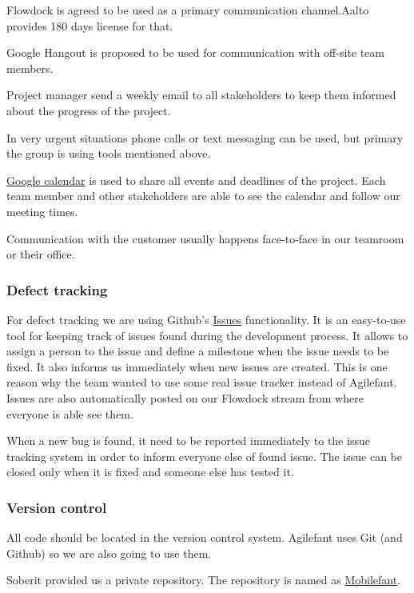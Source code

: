 Flowdock is agreed to be used as a primary communication channel.Aalto provides
180 days license for that.

Google Hangout is proposed to be used for communication with off-site team
members.

Project manager send a weekly email to all stakeholders to keep them informed
about the progress of the project.

In very urgent situations phone calls or text messaging can be used, but primary
the group is using tools mentioned above.

\href{http://tinyurl.com/mobilefant}{Google calendar} is used to share all
events and deadlines of the project. Each team member and other stakeholders
are able to see the calendar and follow our meeting times.

Communication with the customer usually happens face-to-face in our teamroom or
their office.

\subsubsection{Defect tracking}

For defect tracking we are using Github's
\href{https://github.com/soberit/mobilefant/issues}{Issues}
functionality. It is an easy-to-use tool for keeping track of issues found
during the development process. It allows to assign a person to the issue and define a
milestone when the issue needs to be fixed. It also informs us immediately when
new issues are created. This is one reason why the team wanted to use some
real issue tracker instead of Agilefant. Issues are also automatically posted on
our Flowdock stream from where everyone is able see them.

When a new bug is found, it need to be reported immediately to the issue
tracking system in order to inform everyone else of found issue. The issue can
be closed only when it is fixed and someone else has tested it.

\subsubsection{Version control}

All code should be located in the version control system. Agilefant uses Git
(and Github) so we are also going to use them.

Soberit provided us a private repository. The repository is named
as \href{https://github.com/soberit/mobilefant}{Mobilefant}.


